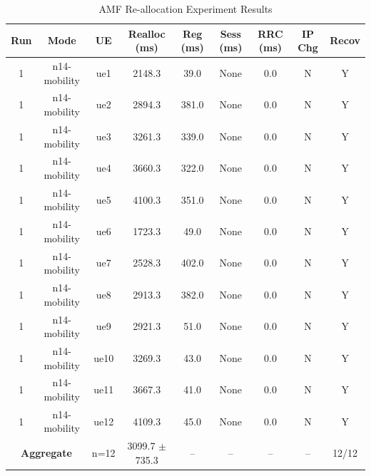 \begin{table}[ht]
\centering
\begin{tabular}{|c|c|c|c|c|c|c|c|c|}
\hline
Run & Mode & UE & Realloc (ms) & Reg (ms) & Sess (ms) & RRC (ms) & IP Chg & Recov \\
\hline
1 & n14-mobility & ue1 & 2148.3 & 39.0 & None & 0.0 & N & Y \\
1 & n14-mobility & ue2 & 2894.3 & 381.0 & None & 0.0 & N & Y \\
1 & n14-mobility & ue3 & 3261.3 & 339.0 & None & 0.0 & N & Y \\
1 & n14-mobility & ue4 & 3660.3 & 322.0 & None & 0.0 & N & Y \\
1 & n14-mobility & ue5 & 4100.3 & 351.0 & None & 0.0 & N & Y \\
1 & n14-mobility & ue6 & 1723.3 & 49.0 & None & 0.0 & N & Y \\
1 & n14-mobility & ue7 & 2528.3 & 402.0 & None & 0.0 & N & Y \\
1 & n14-mobility & ue8 & 2913.3 & 382.0 & None & 0.0 & N & Y \\
1 & n14-mobility & ue9 & 2921.3 & 51.0 & None & 0.0 & N & Y \\
1 & n14-mobility & ue10 & 3269.3 & 43.0 & None & 0.0 & N & Y \\
1 & n14-mobility & ue11 & 3667.3 & 41.0 & None & 0.0 & N & Y \\
1 & n14-mobility & ue12 & 4109.3 & 45.0 & None & 0.0 & N & Y \\
\multicolumn{2}{|c|}{\textbf{Aggregate}} & n=12 & 3099.7 $\pm$ 735.3 & -- & -- & -- & -- & 12/12 \\
\hline
\end{tabular}
\caption{AMF Re-allocation Experiment Results}
\label{tab:amf_realloc}
\end{table}
